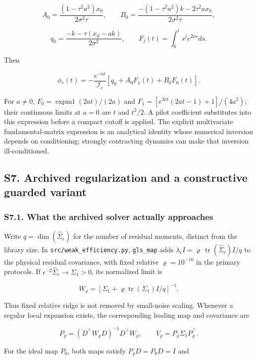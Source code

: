 \documentclass[
  american,
  11pt,
]{article}
\begin{document}
\[
A_0=\frac{(1-\tau^2a^2)x_0}{2\sigma^2\tau},\qquad
B_0=\frac{-(1-\tau^2a^2)k-2\tau^2ax_0}{2\sigma^2\tau},
\]

\[
q_0=\frac{-k-\tau(x_0-ak)}{2\sigma^2},\qquad
F_j(t)=\int_0^t s^je^{2as}ds.
\]

Then

\[
\phi_*(t)=-\frac{e^{-at}}{\mathcal I_e}
[q_0+A_0F_1(t)+B_0F_0(t)].
\]

For \(a\ne0\), \(F_0=\operatorname{expm1}(2at)/(2a)\) and
\(F_1=[e^{2at}(2at-1)+1]/(4a^2)\); their continuous limits at \(a=0\)
are \(t\) and \(t^2/2\). A pilot coefficient substitutes into this
expression before a compact cutoff is applied. The explicit multivariate
fundamental-matrix expression is an analytical identity whose numerical
inversion depends on conditioning; strongly contracting dynamics can
make that inversion ill-conditioned.

\subsection{S7. Archived regularization and a constructive guarded
variant}\label{s7.-archived-regularization-and-a-constructive-guarded-variant}

\subsubsection{S7.1. What the archived solver actually
approaches}\label{s7.1.-what-the-archived-solver-actually-approaches}

Write \(q=\dim(\widehat\Sigma_\epsilon)\) for the number of residual
moments, distinct from the library size. In
\texttt{src/weak\_efficiency.py}, \texttt{gls\_map} adds
\(\lambda_\epsilon I=\varrho\,\operatorname{tr}(\widehat\Sigma_\epsilon)I/q\)
to the physical residual covariance, with fixed relative
\(\varrho=10^{-10}\) in the primary protocols. If
\(\epsilon^{-2}\widehat\Sigma_\epsilon\to\Sigma_1>0\), its normalized
limit is

\[
W_\varrho=\left[\Sigma_1+\varrho\operatorname{tr}(\Sigma_1)I/q\right]^{-1}.
\]

Thus fixed relative ridge is not removed by small-noise scaling.
Whenever a regular local expansion exists, the corresponding leading map
and covariance are

\[
P_\varrho=(D^\top W_\varrho D)^{-1}D^\top W_\varrho,\qquad
V_\varrho=P_\varrho\Sigma_1P_\varrho^\top.
\]

For the ideal map \(P_0\), both maps satisfy \(P_\varrho D=P_0D=I\) and
\end{document}
